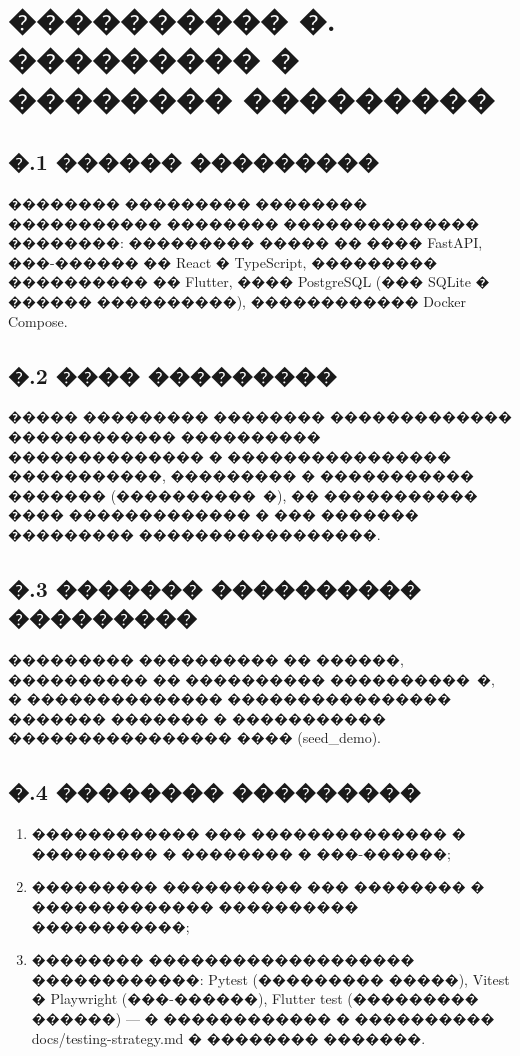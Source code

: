 \chapter{{\fontsize{14pt}{21pt}\selectfont\MakeUppercase{���������� �. ��������� � �������� ���������}}}
\label{app:pimi}

\section*{�.1 ������ ���������}

�������� ��������� �������� ����������� �������� �������������� ��������: ��������� ����� �� ���� FastAPI, ���-������ �� React � TypeScript, ��������� ���������� �� Flutter, ���� PostgreSQL (��� SQLite � ������ ����������), ������������ Docker Compose.

\section*{�.2 ���� ���������}

����� ��������� �������� ������������� ������������ ���������� �������������� � ���������������� �����������, ��������� � ����������� ������� (����������~�), �� ����������� ���� ������������� � ��� ������� ��������� �����������������.

\section*{�.3 ������� ���������� ���������}

��������� ���������� �� ������, ���������� �� ���������� ����������~�, � �������������� ���������������� ������� ������� � ����������� ���������������� ���� (seed\_demo).

\section*{�.4 �������� ���������}

\begin{enumerate}
  \item ������������ ��� �������������� � ��������� � �������� � ���-������;
  \item ��������� ���������� ��� �������� � ������������� ���������� �����������;
  \item �������� ������������������� ������������: Pytest (��������� �����), Vitest � Playwright (���-������), Flutter test (��������� ������) --- � ������������ � ���������� docs/testing-strategy.md � �������� �������.
\end{enumerate}

